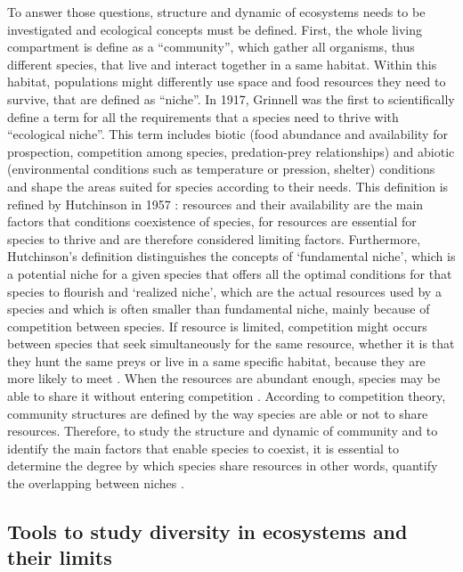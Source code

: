 \documentclass[a4paper, 12pt]{article}
\begin{document}
To answer those questions, structure and dynamic of ecosystems needs to be investigated and ecological concepts must be defined. First, the whole living compartment is define as a “community”, which gather all organisms, thus different species, that live and interact together in a same habitat. Within this habitat, populations might differently use space and food resources they need to survive, that are defined as “niche”. In 1917, Grinnell was the first to scientifically define a term for all the requirements that a species need to thrive with “ecological niche”. This term includes biotic (food abundance and availability for prospection, competition among species, predation-prey relationships) and abiotic (environmental conditions such as temperature or pression, shelter) conditions and shape the areas suited for species according to their needs. This definition is refined by Hutchinson in 1957 : resources and their availability are the main factors that conditions coexistence of species, for resources are essential for species to thrive and are therefore considered limiting factors. Furthermore, Hutchinson’s definition distinguishes the concepts of ‘fundamental niche’, which is a potential niche for a given species that offers all the optimal conditions for that species to flourish and ‘realized niche’, which are the actual resources used by a species and which is often smaller than fundamental niche, mainly because of competition between species. If resource is limited, competition might occurs between species that seek simultaneously for the same resource, whether it is that they hunt the same preys or live in a same specific habitat, because they are more likely to meet \citep{blondel1979}. When the resources are abundant enough, species may be able to share it without entering competition \citep{nagelkerke2018}. According to competition theory, community structures are defined by the way species are able or not to share resources. Therefore, to study the structure and dynamic of community and to identify the main factors that enable species to coexist, it is essential to determine the degree by which species share resources in other words, quantify the overlapping between niches \citep{geange2011}.

\subsection{Tools to study diversity in ecosystems and their limits}
\end{document}
